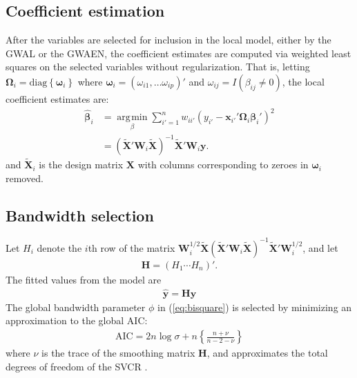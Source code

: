 \documentclass[authoryear, review, 11pt]{elsarticle}
\DeclareMathOperator*{\argmin}{\arg\!\min}
\begin{document}
	\subsection{Coefficient estimation}
	After the variables are selected for inclusion in the local model, either by the GWAL or the GWAEN, the coefficient estimates are computed via weighted least squares on the selected variables without regularization. That is, letting $\bm{\Omega}_i = \text{diag}\left\{\bm{\omega}_i\right\}$ where $\bm{\omega}_i = \left(\omega_{i1}, \dots \omega_{ip}\right)'$ and $\omega_{ij}= I \left(\beta_{ij} \neq 0\right)$, the local coefficient estimates are:
	\begin{align} \label{eq:coefficients}
		\hat{\bm{\beta}}_i &= \argmin \limits_{\beta} \sum_{i'=1}^n w_{ii'} \left( y_{i'} - \bm{x}_{i'}' \bm{\Omega}_i \bm{\beta}_i' \right)^2\\
		&= \left( \tilde{\bm{X}}'\bm{W}_i \tilde{\bm{X}} \right)^{-1} \tilde{\bm{X}} '\bm{W}_i\bm{y}.
	\end{align}
	and $\tilde{\bm{X}}_i$ is the design matrix $\bm{X}$ with columns corresponding to zeroes in $\bm{\omega}_i$ removed.
	 
	\subsection{Bandwidth selection}
	Let $H_i$ denote the $i$th row of the matrix $\bm{W}_i^{1/2} \tilde{\bm{X}} \left( \tilde{\bm{X}}'\bm{W}_i \tilde{\bm{X}} \right)^{-1} \tilde{\bm{X}}'\bm{W}_i^{1/2}$, and let	
	\begin{align}
		\bm{H} = \left(H_1 \cdots H_n \right)'.
	\end{align}	
	The fitted values from the model are	
	\begin{align}
		\hat{\bm{y}} = \bm{H} \bm{y}
	\end{align}	
	The global bandwidth parameter $\phi$ in (\ref{eq:bisquare}) is selected by minimizing an approximation to the global AIC:	
	\begin{align}
		\text{AIC} = 2 n \log{\sigma} + n \left\{\frac{n + \nu}{n - 2 - \nu}\right\}
	\end{align}	
	where $\nu$ is the trace of the smoothing matrix $\bm{H}$, and approximates the total degrees of freedom of the SVCR \citep{Hurvich:1998}.
	
\end{document}
